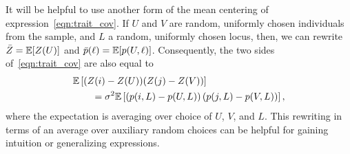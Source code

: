 It will be helpful to use another form of the mean centering
of expression~\eqref{eqn:trait_cov}.
%
If $U$ and $V$ are random, uniformly chosen individuals from the sample,
and $L$ a random, uniformly chosen locus,
then, we can rewrite $\bar Z = \mathbb{E}[Z(U)]$ and $\bar p(\ell) = \mathbb{E}[p(U,\ell)]$.
%
Consequently, the two sides of~\eqref{eqn:trait_cov}
are also equal to
%
\begin{align} \label{eqn:trait_cov_avg}
    \begin{split}
        &\mathbb{E}\left[(Z(i) - Z(U))(Z(j) - Z(V)\right)] \\
        &\qquad = \sigma^2 \mathbb{E}\left[
            \left(p(i,L) - p(U,L)\right) \left(p(j,L) - p(V,L)\right)
        \right] ,
    \end{split}
\end{align}
%
where the expectation is averaging over choice of $U$, $V$, and $L$.
%
This rewriting in terms of an average over auxiliary random choices
can be helpful for gaining intuition or generalizing expressions.



